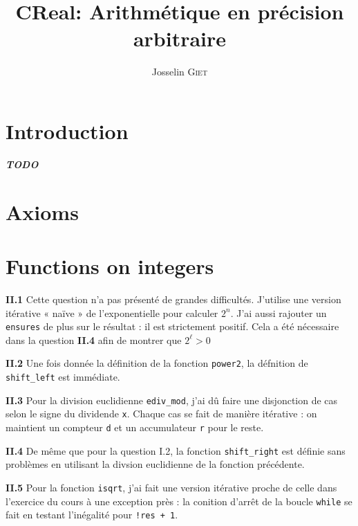 \documentclass[9pt,a4paper,twocolumn]{article}
\title{CReal: Arithmétique en précision arbitraire}   %
\author{Josselin \textsc{Giet}}  %
\theoremstyle{definition}
\newcommand{\TODO}{{\color{red}\textbf{\textit{TODO}}}}
\newenvironment{code}[1][ocaml]{%
\newgeometry{textwidth = 0.8\textwidth}
\VerbatimEnvironment\begin{verbatim}%
}{%
\end{verbatim}
\restoregeometry
}
\begin{document}
\maketitle

\section*{Introduction}
\TODO

\section{Axioms}

\section{Functions on integers}

\textbf{II.1}
Cette question n'a pas présenté de grandes difficultés.
J'utilise une version itérative « naïve » de l'exponentielle pour
calculer $2^n$.
J'ai aussi rajouter un \texttt{ensures} de plus sur le résultat :
il est strictement positif.
Cela a été nécessaire dans la question \textbf{II.4} afin de montrer que
$2^\ell > 0$


\textbf{II.2}
Une fois donnée la définition de la fonction \texttt{power2}, la défnition de
\texttt{shift\_left} est immédiate.

\textbf{II.3}
Pour la division euclidienne \texttt{ediv\_mod}, j'ai dû faire une disjonction
de cas selon le signe du dividende \texttt{x}.
Chaque cas se fait de manière itérative : on maintient un compteur \texttt{d}
et un accumulateur \texttt{r} pour le reste.

\textbf{II.4}
De même que pour la question I.2, la fonction \texttt{shift\_right} est définie
sans problèmes en utilisant la divsion euclidienne de la fonction
précédente.

\textbf{II.5}
Pour la fonction \texttt{isqrt}, j'ai fait une version itérative proche de
celle dans l'exercice du cours à une exception près : la conition d'arrêt de
la boucle \texttt{while} se fait en testant l'inégalité pour \texttt{!res + 1}.
\end{document}
